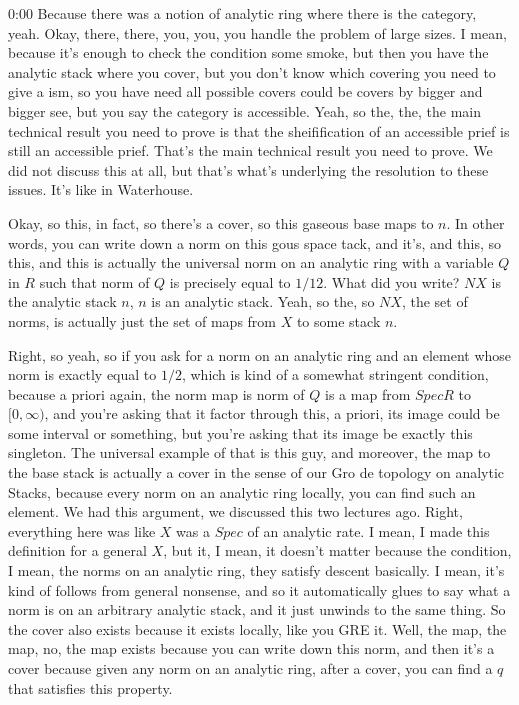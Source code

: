 \begin{unfinished}{0:00}
Because there was a notion of analytic ring where there is the category, yeah. Okay, there, there, you, you, you handle the problem of large sizes. I mean, because it's enough to check the condition some smoke, but then you have the analytic stack where you cover, but you don't know which covering you need to give a ism, so you have need all possible covers could be covers by bigger and bigger see, but you say the category is accessible. Yeah, so the, the, the main technical result you need to prove is that the sheifification of an accessible prief is still an accessible prief. That's the main technical result you need to prove. We did not discuss this at all, but that's what's underlying the resolution to these issues. It's like in Waterhouse.

Okay, so this, in fact, so there's a cover, so this gaseous base maps to $n$. In other words, you can write down a norm on this gous space tack, and it's, and this, so this, and this is actually the universal norm on an analytic ring with a variable $Q$ in $R$ such that norm of $Q$ is precisely equal to $1/12$. What did you write? $NX$ is the analytic stack $n$, $n$ is an analytic stack. Yeah, so the, so $NX$, the set of norms, is actually just the set of maps from $X$ to some stack $n$.

Right, so yeah, so if you ask for a norm on an analytic ring and an element whose norm is exactly equal to $1/2$, which is kind of a somewhat stringent condition, because a priori again, the norm map is norm of $Q$ is a map from $Spec R$ to $[0, \infty)$, and you're asking that it factor through this, a priori, its image could be some interval or something, but you're asking that its image be exactly this singleton. The universal example of that is this guy, and moreover, the map to the base stack is actually a cover in the sense of our Gro de topology on analytic Stacks, because every norm on an analytic ring locally, you can find such an element. We had this argument, we discussed this two lectures ago. Right, everything here was like $X$ was a $Spec$ of an analytic rate. I mean, I made this definition for a general $X$, but it, I mean, it doesn't matter because the condition, I mean, the norms on an analytic ring, they satisfy descent basically. I mean, it's kind of follows from general nonsense, and so it automatically glues to say what a norm is on an arbitrary analytic stack, and it just unwinds to the same thing. So the cover also exists because it exists locally, like you GRE it. Well, the map, the map, no, the map exists because you can write down this norm, and then it's a cover because given any norm on an analytic ring, after a cover, you can find a $q$ that satisfies this property.


\end{unfinished}
